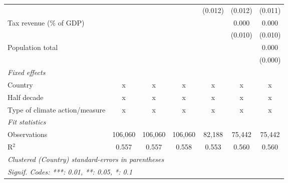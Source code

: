 \begin{tabular}{lcccccc}
                                                        &         &                &                & (0.012)        & (0.012)        & (0.011)\\   
   Tax revenue (\% of GDP)                              &         &                &                &                & 0.000          & 0.000\\   
                                                        &         &                &                &                & (0.010)        & (0.010)\\   
   Population total                                     &         &                &                &                &                & 0.000\\   
                                                        &         &                &                &                &                & (0.000)\\   
   \emph{Fixed effects}\\
   Country                                              & x       & x              & x              & x              & x              & x\\  
   Half decade                                          & x       & x              & x              & x              & x              & x\\  
   Type of climate action/measure                       & x       & x              & x              & x              & x              & x\\  
   \midrule \emph{Fit statistics}\\
   Observations                                         & 106,060 & 106,060        & 106,060        & 82,188         & 75,442         & 75,442\\  
   R$^2$                                                & 0.557   & 0.557          & 0.558          & 0.553          & 0.560          & 0.560\\  
   \midrule
   \multicolumn{7}{l}{\emph{Clustered (Country) standard-errors in parentheses}}\\
   \multicolumn{7}{l}{\emph{Signif. Codes: ***: 0.01, **: 0.05, *: 0.1}}\\
\end{tabular}
\par\endgroup


